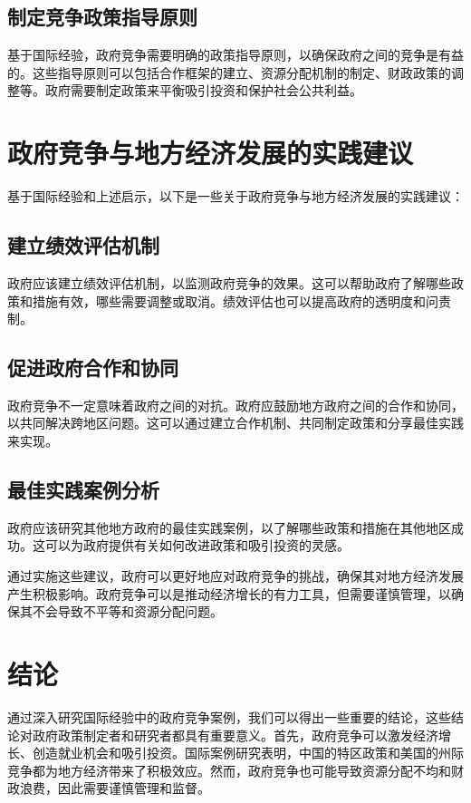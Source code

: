 \documentclass[a4paper,12pt]{ctexart}
\begin{document}
\subsection{制定竞争政策指导原则}

基于国际经验，政府竞争需要明确的政策指导原则，以确保政府之间的竞争是有益的。这些指导原则可以包括合作框架的建立、资源分配机制的制定、财政政策的调整等。政府需要制定政策来平衡吸引投资和保护社会公共利益。

\section{政府竞争与地方经济发展的实践建议}

基于国际经验和上述启示，以下是一些关于政府竞争与地方经济发展的实践建议：

\subsection{建立绩效评估机制}

政府应该建立绩效评估机制，以监测政府竞争的效果。这可以帮助政府了解哪些政策和措施有效，哪些需要调整或取消。绩效评估也可以提高政府的透明度和问责制。

\subsection{促进政府合作和协同}

政府竞争不一定意味着政府之间的对抗。政府应鼓励地方政府之间的合作和协同，以共同解决跨地区问题。这可以通过建立合作机制、共同制定政策和分享最佳实践来实现。

\subsection{最佳实践案例分析}

政府应该研究其他地方政府的最佳实践案例，以了解哪些政策和措施在其他地区成功。这可以为政府提供有关如何改进政策和吸引投资的灵感。

通过实施这些建议，政府可以更好地应对政府竞争的挑战，确保其对地方经济发展产生积极影响。政府竞争可以是推动经济增长的有力工具，但需要谨慎管理，以确保其不会导致不平等和资源分配问题。
\section{结论}

通过深入研究国际经验中的政府竞争案例，我们可以得出一些重要的结论，这些结论对政府政策制定者和研究者都具有重要意义。首先，政府竞争可以激发经济增长、创造就业机会和吸引投资。国际案例研究表明，中国的特区政策和美国的州际竞争都为地方经济带来了积极效应。然而，政府竞争也可能导致资源分配不均和财政浪费，因此需要谨慎管理和监督。
\end{document}

